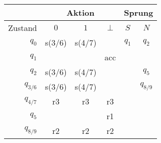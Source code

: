 \documentclass[border=0.2cm, convert={density=600}]{standalone}
\begin{document}

\begin{tabular}{|r|ccc|cc|}
	\hline\rowcolor{lightgray}
	& \multicolumn{3}{c|}{Aktion} & \multicolumn{2}{c|}{Sprung}\\
	\hline\rowcolor{lightgray}
	Zustand & $0$ & $1$ & $\bot$ &  $S$  &  $N$ \\
	\hline\rowcolor{lightergray}
	$q_0$     & s(3/6) & s(4/7) &     & $q_1$ & $q_2$       \\ \rowcolor{lightgray}
	$q_1$     &        &        & acc &       &             \\ \rowcolor{lightergray}
	$q_2$     & s(3/6) & s(4/7) &     &       & $q_5$       \\ \rowcolor{lightgray}
	$q_{3/6}$ & s(3/6) & s(4/7) &     &       & $q_{8/9}$   \\ \rowcolor{lightergray}
	$q_{4/7}$ &   r3   &   r3   & r3  &       &             \\ \rowcolor{lightgray}
	$q_5$     &        &        & r1  &       &             \\ \rowcolor{lightergray}
	$q_{8/9}$ &   r2   &   r2   & r2  &       &             \\
	\hline
\end{tabular}
\end{document}
